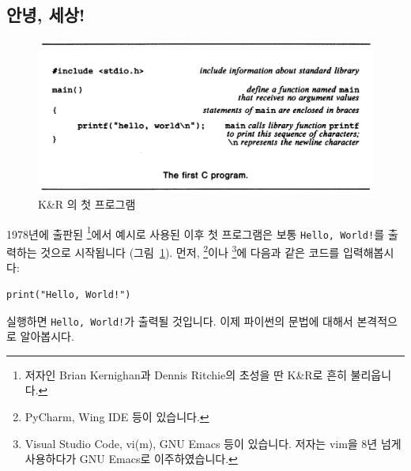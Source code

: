 \documentclass[../main.tex]{subfiles}
\begin{document}
\subsection{안녕, 세상!}

\begin{figure}[htpb]
  \centering
  \includegraphics[width=0.8\linewidth]{./figures/hello_world.png}
  \caption{K\&R 의 첫 프로그램}\label{fig:hello}
\end{figure}

1978년에 출판된 \footnote{저자인 Brian Kernighan과 Dennis Ritchie의 초성을 딴 K\&R로 흔히 불리웁니다.}에서 예시로 사용된 이후 첫 프로그램은 보통 \texttt{Hello, World!}를 출력하는 것으로 시작됩니다 (그림~\ref{fig:hello}).
먼저, \footnote{PyCharm, Wing IDE 등이 있습니다.}이나 \footnote{Visual Studio Code, vi(m), GNU Emacs 등이 있습니다. 저자는 vim을 8년 넘게 사용하다가 GNU Emacs로 이주하였습니다.}에 다음과 같은 코드를 입력해봅시다:
\begin{verbatim}
print("Hello, World!")
\end{verbatim}
실행하면 \verb/Hello, World!/가 출력될 것입니다.
이제 파이썬의 문법에 대해서 본격적으로 알아봅시다.
\end{document}
